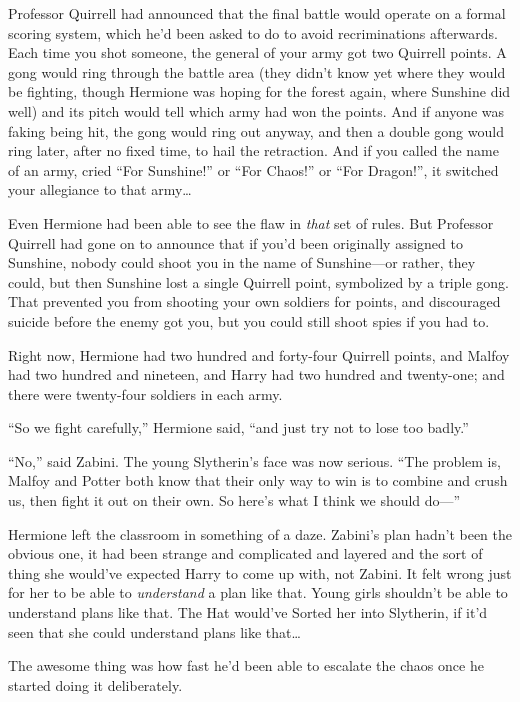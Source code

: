 Professor Quirrell had announced that the final battle would operate on a formal scoring system, which he’d been asked to do to avoid recriminations afterwards. Each time you shot someone, the general of your army got two Quirrell points. A gong would ring through the battle area (they didn’t know yet where they would be fighting, though Hermione was hoping for the forest again, where Sunshine did well) and its pitch would tell which army had won the points. And if anyone was faking being hit, the gong would ring out anyway, and then a double gong would ring later, after no fixed time, to hail the retraction. And if you called the name of an army, cried “For Sunshine!” or “For Chaos!” or “For Dragon!”, it switched your allegiance to that army…

Even Hermione had been able to see the flaw in \emph{that} set of rules. But Professor Quirrell had gone on to announce that if you’d been originally assigned to Sunshine, nobody could shoot you in the name of Sunshine—or rather, they could, but then Sunshine lost a single Quirrell point, symbolized by a triple gong. That prevented you from shooting your own soldiers for points, and discouraged suicide before the enemy got you, but you could still shoot spies if you had to.

Right now, Hermione had two hundred and forty-four Quirrell points, and Malfoy had two hundred and nineteen, and Harry had two hundred and twenty-one; and there were twenty-four soldiers in each army.

“So we fight carefully,” Hermione said, “and just try not to lose too badly.”

“No,” said Zabini. The young Slytherin’s face was now serious. “The problem is, Malfoy and Potter both know that their only way to win is to combine and crush us, then fight it out on their own. So here’s what I think we should do—”

Hermione left the classroom in something of a daze. Zabini’s plan hadn’t been the obvious one, it had been strange and complicated and layered and the sort of thing she would’ve expected Harry to come up with, not Zabini. It felt wrong just for her to be able to \emph{understand} a plan like that. Young girls shouldn’t be able to understand plans like that. The Hat would’ve Sorted her into Slytherin, if it’d seen that she could understand plans like that…

\later

The awesome thing was how fast he’d been able to escalate the chaos once he started doing it deliberately.

